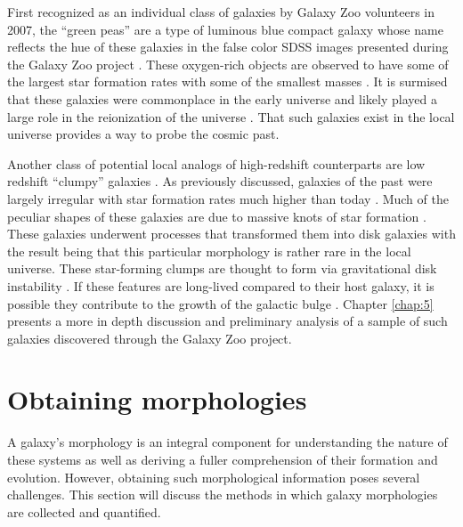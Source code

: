 First recognized as an individual class of galaxies by Galaxy Zoo volunteers in 2007, the ``green peas'' are a type of luminous blue compact galaxy whose name reflects the hue of these galaxies in the false color SDSS images presented during the Galaxy Zoo project \citep{Lintott2008,Cardamone2009}. These oxygen-rich objects are observed to have some of the largest star formation rates with some of the smallest masses \citep{Amorin2010}. It is surmised that these galaxies were commonplace in the early universe and likely played a large role in the reionization of the universe \citep{Izotov2016}. That such galaxies exist in the local universe provides a way to probe the cosmic past. 

Another class of potential local analogs of high-redshift counterparts are low redshift ``clumpy'' galaxies \citep{Elmegreen2005,Elmegreen2013}. As previously discussed, galaxies of the past were largely irregular with star formation rates much higher than today \citep{Madau2014}. Much of the peculiar shapes of these galaxies are due to massive knots of star formation \citep{Guo2015}. These galaxies underwent processes that transformed them into disk galaxies with the result being that this particular morphology is rather rare in the local universe. These star-forming clumps are thought to form via gravitational disk instability \citep{Toomre1964}. If these features are long-lived compared to their host galaxy, it is possible they contribute to the growth of the galactic bulge \citep{Conselice2014}. Chapter \ref{chap:5} presents a more in depth discussion and preliminary analysis of a sample of such galaxies discovered through the Galaxy Zoo project.


\section{Obtaining morphologies}

A galaxy's morphology is an integral component for understanding the nature of these systems as well as deriving a fuller comprehension of their formation and evolution. However, obtaining such morphological information poses several challenges. This section will discuss the methods in which galaxy morphologies are collected and quantified. 

